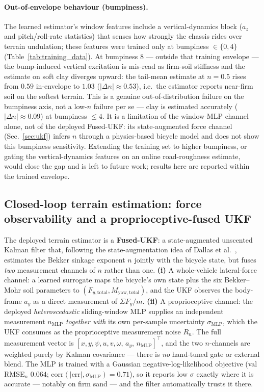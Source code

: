 \documentclass[conference,letterpaper,10pt]{IEEEtran}
\begin{document}
\paragraph{Out-of-envelope behaviour (bumpiness).}
The learned estimator's window features include a vertical-dynamics
block ($a_z$ and pitch/roll-rate statistics) that senses how strongly
the chassis rides over terrain undulation; these features were trained
only at bumpiness $\in\{0,4\}$ (Table~\ref{tab:training_data}). At
bumpiness $8$ --- outside that training envelope --- the bump-induced
vertical excitation is mis-read as firm-soil stiffness and the estimate
on soft clay diverges upward: the tail-mean estimate at $n=0.5$ rises
from $0.59$ in-envelope to $1.03$ ($|\Delta n|\!\approx\!0.53$), i.e.\
the estimator reports near-firm soil on the softest terrain. This is a
genuine out-of-distribution failure on the bumpiness axis, not a
low-$n$ failure per se --- clay is estimated accurately
($|\Delta n|\!\approx\!0.09$) at bumpiness $\le 4$. It is a limitation
of the window-MLP channel alone, not of the deployed Fused-UKF: its
state-augmented force channel (Sec.~\ref{sec:ukf}) infers $n$ through a
physics-based bicycle model and does not show this bumpiness sensitivity.
Extending the training set to higher bumpiness, or gating the
vertical-dynamics features on an online road-roughness estimate, would
close the gap and is left to future work; results here are reported
within the trained envelope.

\subsection{Closed-loop terrain estimation: force observability and a proprioceptive-fused UKF}
\label{sec:estimator_ukf}
\label{sec:ukf}

The deployed terrain estimator is a \textbf{Fused-UKF}: a
state-augmented unscented Kalman filter that, following the
state-augmentation idea of Dallas et al.~\cite{Dallas21}, estimates
the Bekker sinkage exponent $n$ jointly with the bicycle state, but
fuses \emph{two} measurement channels of $n$ rather than one.
\textbf{(i)} A whole-vehicle lateral-force channel: a learned surrogate
maps the bicycle's own state plus the six Bekker--Mohr soil parameters
to $(F_{y,\mathrm{total}}, M_{\mathrm{yaw,total}})$, and the UKF
observes the body-frame $a_y$ as a direct measurement of
$\Sigma F_y/m$. \textbf{(ii)} A proprioceptive channel: the deployed
\emph{heteroscedastic} sliding-window MLP supplies an independent
measurement $n_{\mathrm{MLP}}$ \emph{together with} its own per-sample
uncertainty $\sigma_{\mathrm{MLP}}$, which the UKF consumes as the
proprioceptive measurement noise $R_n$. The full measurement vector is
$[x,y,\psi,u,v,\omega,\,a_y,\,n_{\mathrm{MLP}}]^\top$, and the two
$n$-channels are weighted purely by Kalman covariance --- there is
\emph{no} hand-tuned gate or external blend. The MLP is trained with a
Gaussian negative-log-likelihood objective (val RMSE$_n$ $0.064$;
$\mathrm{corr}(|\mathrm{err}|,\sigma_{\mathrm{MLP}})\!=\!0.71$), so it
reports low $\sigma$ exactly where it is accurate --- notably on firm
sand --- and the filter automatically trusts it there.
\end{document}
